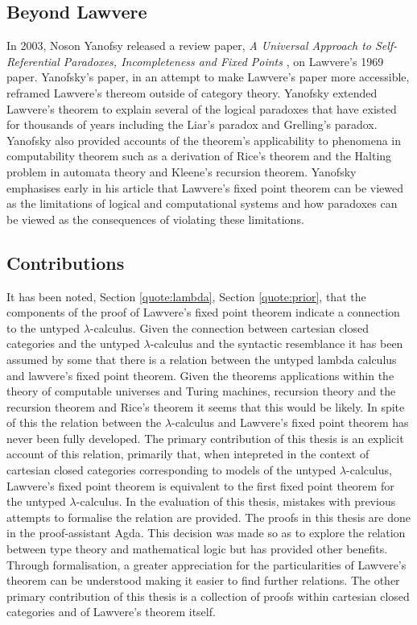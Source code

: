 \subsection{Beyond Lawvere}
\label{section:yanofsky}
In 2003, Noson Yanofsy released a review paper, \textit{A Universal Approach to
Self-Referential Paradoxes, Incompleteness and Fixed Points}
\cite{yanofsky2003universal}, on Lawvere's 1969
paper.  Yanofsky's paper, in an attempt to make Lawvere's paper more accessible,
reframed Lawvere's thereom outside of category theory. Yanofsky extended
Lawvere's theorem to explain several of the logical paradoxes that have existed
for thousands of years including the Liar's paradox and Grelling's paradox.
Yanofsky also provided accounts of the theorem's applicability to phenomena in
computability theorem such as a derivation of Rice's theorem  and the Halting
problem in automata theory and Kleene's recursion theorem. Yanofsky emphasises
early in his article that Lawvere's fixed point theorem can be viewed as the
limitations of logical and computational systems and how paradoxes can be viewed
as the consequences of violating these limitations.
\subsection{Contributions}
It has been noted, Section \ref{quote:lambda}, Section \ref{quote:prior}, that the components of the proof of Lawvere's fixed point
theorem indicate a connection to the untyped $\lambda$-calculus. Given the connection between cartesian closed categories and
the untyped $\lambda$-calculus and the syntactic resemblance it has been assumed by
some that there is a relation between the untyped lambda calculus and lawvere's
fixed point theorem. Given the theorems applications within the theory of
computable universes and Turing machines, recursion theory and the recursion
theorem and Rice's theorem it seems that this would be likely. In spite of this
the relation between the $\lambda$-calculus and Lawvere's fixed point theorem has
never been fully developed. The primary contribution of this thesis is an
explicit account of this relation, primarily that, when intepreted in the
context of cartesian closed categories corresponding to models of the untyped
$\lambda$-calculus, Lawvere's fixed point theorem is equivalent to the first
fixed point theorem for the untyped $\lambda$-calculus. In the evaluation of
this thesis, mistakes with previous attempts to formalise the relation are
provided. The proofs in this thesis are done in the proof-assistant Agda. This
decision was made so as to explore the relation between type theory and
mathematical logic but has provided other benefits. Through formalisation, a
greater appreciation for the particularities of Lawvere's theorem can be
understood making it easier to find further relations. The other primary
contribution of this thesis is a collection of proofs within cartesian closed
categories and of Lawvere's theorem itself.
